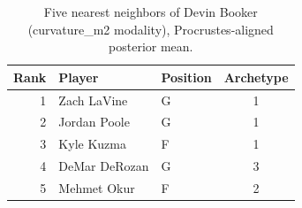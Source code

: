 \begin{table}[htbp]
  \centering\small
  \begin{tabular}{rllc}
    \toprule
    Rank & Player & Position & Archetype \\
    \midrule
    1 & Zach LaVine & G & 1 \\
    2 & Jordan Poole & G & 1 \\
    3 & Kyle Kuzma & F & 1 \\
    4 & DeMar DeRozan & G & 3 \\
    5 & Mehmet Okur & F & 2 \\
    \bottomrule
  \end{tabular}
  \caption{Five nearest neighbors of Devin Booker (curvature_m2 modality), Procrustes-aligned posterior mean.}
  \label{tab:Devin_Booker_neighbors_curvature_m2}
\end{table}

